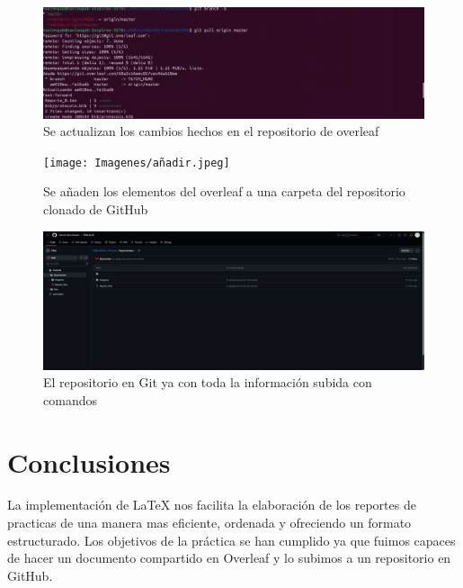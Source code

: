 \documentclass[letterpaper,12pt]{article}
\begin{document}
\begin{figure}[H]
    \centering
    \includegraphics[width=14cm]{Imagenes/pull.jpeg}
    \caption{Se actualizan los cambios hechos en el repositorio de overleaf}
    \label{fig:colaboradores}
\end{figure}

\begin{figure}[H]
    \centering
    \texttt{[image: Imagenes/añadir.jpeg]}
    \caption{Se añaden los elementos del overleaf a una carpeta del repositorio clonado de GitHub}
    \label{fig:colaboradores}
\end{figure}

\begin{figure}[H]
    \centering
    \includegraphics[width=14cm]{Imagenes/ultimo.png}
    \caption{El repositorio en Git ya con toda la información subida con comandos}
    \label{fig:colaboradores}
\end{figure}

\clearpage

\section{Conclusiones}
La implementación de LaTeX nos facilita la elaboración de los reportes de practicas de una manera mas eficiente, ordenada y ofreciendo un formato estructurado. Los objetivos de la práctica se han cumplido ya que fuimos capaces de hacer un documento compartido en Overleaf y lo subimos a un repositorio en GitHub.

\printbibliography

\clearpage
\end{document}
